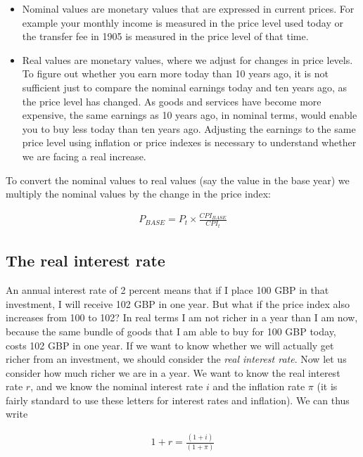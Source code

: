 \documentclass[
]{book}
\begin{document}
\begin{itemize}
\item
  Nominal values are monetary values that are expressed in current prices. For example your monthly income is measured in the price level used today or the transfer fee in 1905 is measured in the price level of that time.
\item
  Real values are monetary values, where we adjust for changes in price levels. To figure out whether you earn more today than 10 years ago, it is not sufficient just to compare the nominal earnings today and ten years ago, as the price level has changed. As goods and services have become more expensive, the same earnings as 10 years ago, in nominal terms, would enable you to buy less today than ten years ago. Adjusting the earnings to the same price level using inflation or price indexes is necessary to understand whether we are facing a real increase.
\end{itemize}

To convert the nominal values to real values (say the value in the base year) we multiply the nominal values by the change in the price index:

\begin{align}
    P_{BASE}=P_t\times \frac{CPI_{BASE} }{CPI_t}
\end{align}

\hypertarget{the-real-interest-rate}{%
\subsection{The real interest rate}\label{the-real-interest-rate}}

An annual interest rate of 2 percent means that if I place 100 GBP in that investment, I will receive 102 GBP in one year. But what if the price index also increases from 100 to 102? In real terms I am not richer in a year than I am now, because the same bundle of goods that I am able to buy for 100 GBP today, costs 102 GBP in one year. If we want to know whether we will actually get richer from an investment, we should consider the \emph{real interest rate}. Now let us consider how much richer we are in a year. We want to know the real interest rate \(r\), and we know the nominal interest rate \(i\) and the inflation rate \(\pi\) (it is fairly standard to use these letters for interest rates and inflation). We can thus write

\begin{align}
    1+r= \frac{(1+i)}{(1+\pi)}
\end{align}
\end{document}
